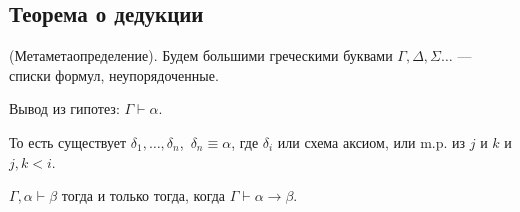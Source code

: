 \subsection{Теорема о дедукции}

\begin{definition}
    (Метаметаопределение).
    Будем большими греческими буквами $\Gamma, \Delta, \Sigma\ldots$ --- списки формул, неупорядоченные.
\end{definition}

\begin{definition}
    Вывод из гипотез: $\Gamma \vdash \alpha$.

    То есть существует $\delta_1,\dots, \delta_n$,~$\delta_n \equiv \alpha$, где $\delta_i$ или схема аксиом, или m.p. из $j$ и $k$ и $j, k < i$.
\end{definition}

\begin{theorem}
    $ \Gamma, \alpha \vdash \beta$ тогда и только тогда, когда $\Gamma \vdash \alpha \to \beta$.
\end{theorem}

